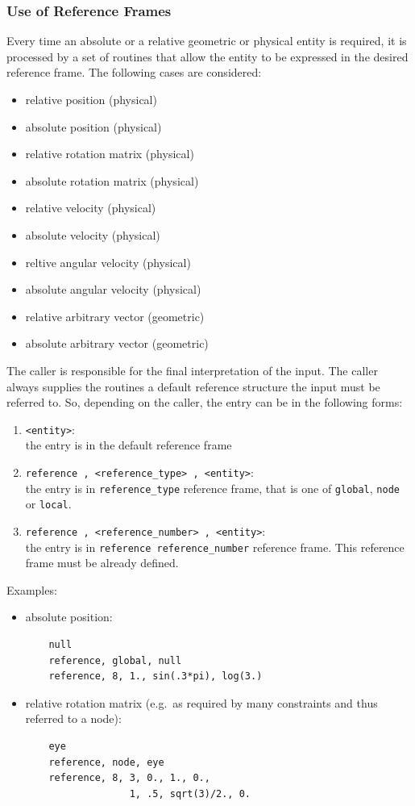 \documentclass[10pt,dvips]{report}
\begin{document}
\subsubsection{Use of Reference Frames}
Every time an absolute or a relative geometric or physical entity is
required, it is processed by a set of routines that allow the entity to be
expressed in the desired reference frame.
The following cases are considered:
\begin{itemize}
    \item relative position (physical)
    \item absolute position (physical)
    \item relative rotation matrix (physical)
    \item absolute rotation matrix (physical)
    \item relative velocity (physical)
    \item absolute velocity (physical)
    \item reltive angular velocity (physical)
    \item absolute angular velocity (physical)
    \item relative arbitrary vector (geometric)
    \item absolute arbitrary vector (geometric)    
\end{itemize}
The caller is responsible for the final interpretation of the input. 
The caller always supplies the routines a default reference structure
the input must be referred to.
So, depending on the caller, the entry can be in the following forms:
\begin{enumerate}
    \item {\tt <entity>}: \\ 
    the entry is in the default reference frame
    \item {\tt reference , <reference\_type> , <entity>}: \\
    the entry is in {\tt reference\_type} reference frame, 
    that is one of {\tt global}, 
    {\tt node} or {\tt local}.
    \item {\tt reference , <reference\_number> , <entity>}: \\
    the entry is in {\tt reference reference\_number} reference frame. 
    This reference frame must be already defined. 
\end{enumerate}
Examples:
\begin{itemize}
    \item absolute position:
    \begin{verbatim}
    null
    reference, global, null
    reference, 8, 1., sin(.3*pi), log(3.)
    \end{verbatim}
    \item relative rotation matrix (e.g.\ as required by many constraints and
    thus referred to a node):
    \begin{verbatim}
    eye
    reference, node, eye
    reference, 8, 3, 0., 1., 0., 
                  1, .5, sqrt(3)/2., 0.
    \end{verbatim}
\end{itemize}
\end{document}
